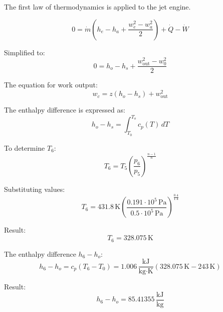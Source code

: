 The first law of thermodynamics is applied to the jet engine.  

\[
0 = \dot{m} \left( h_e - h_a + \frac{w_e^2 - w_a^2}{2} \right) + \dot{Q} - \dot{W}
\]

Simplified to:  
\[
0 = h_o - h_s + \frac{w_{\text{out}}^2 - w_0^2}{2}
\]

The equation for work output:  
\[
w_c = z \left( h_o - h_s \right) + w_{\text{out}}^2
\]

The enthalpy difference is expressed as:  
\[
h_o - h_s = \int_{T_0}^{T_o} c_p(T) \, dT
\]

To determine \( T_6 \):  
\[
T_6 = T_5 \left( \frac{p_6}{p_5} \right)^{\frac{n-1}{n}}
\]

Substituting values:  
\[
T_6 = 431.8 \, \text{K} \left( \frac{0.191 \cdot 10^5 \, \text{Pa}}{0.5 \cdot 10^5 \, \text{Pa}} \right)^{\frac{0.4}{1.4}}
\]

Result:  
\[
T_6 = 328.075 \, \text{K}
\]

The enthalpy difference \( h_6 - h_o \):  
\[
h_6 - h_o = c_p \left( T_6 - T_0 \right) = 1.006 \, \frac{\text{kJ}}{\text{kg·K}} \left( 328.075 \, \text{K} - 243 \, \text{K} \right)
\]

Result:  
\[
h_6 - h_o = 85.41355 \, \frac{\text{kJ}}{\text{kg}}
\]